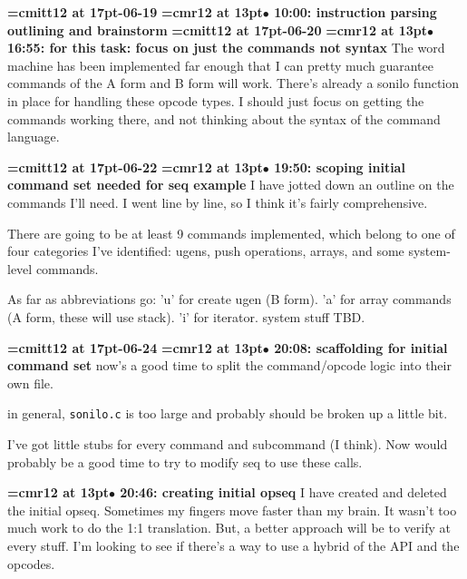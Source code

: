 {\medskip\noindent\bf\font\titlefont=cmitt12 at 17pt-06-19}\medskip
{\smallskip\noindent\bf\font\titlefont=cmr12 at 13pt\titlefont $\bullet$ 10:00: instruction parsing outlining and brainstorm}\smallskip
{\medskip\noindent\bf\font\titlefont=cmitt12 at 17pt-06-20}\medskip
{\smallskip\noindent\bf\font\titlefont=cmr12 at 13pt\titlefont $\bullet$ 16:55: for this task: focus on just the commands not syntax}\smallskip
The word machine has been implemented far enough that I can pretty much guarantee commands of the A form and B form will work. There's already a sonilo function in place for handling these opcode types. I should just focus on getting the commands working there, and not thinking about the syntax of the command language.
\par

{\medskip\noindent\bf\font\titlefont=cmitt12 at 17pt-06-22}\medskip
{\smallskip\noindent\bf\font\titlefont=cmr12 at 13pt\titlefont $\bullet$ 19:50: scoping initial command set needed for seq example}\smallskip
I have jotted down an outline on the commands I'll need. I went line by line, so I think it's fairly comprehensive.
\par

There are going to be at least 9 commands implemented, which belong to one of four categories I've identified: ugens, push operations, arrays, and some system-level commands.
\par

As far as abbreviations go: 'u' for create ugen (B form). 'a' for array commands (A form, these will use stack). 'i' for iterator. system stuff TBD.
\par

{\medskip\noindent\bf\font\titlefont=cmitt12 at 17pt-06-24}\medskip
{\smallskip\noindent\bf\font\titlefont=cmr12 at 13pt\titlefont $\bullet$ 20:08: scaffolding for initial command set}\smallskip
now's a good time to split the command/opcode logic into their own file.
\par

in general, {\tt sonilo.c} is too large and probably should be broken up a little bit.
\par

I've got little stubs for every command and subcommand (I think). Now would probably be a good time to try to modify seq to use these calls.
\par

{\smallskip\noindent\bf\font\titlefont=cmr12 at 13pt\titlefont $\bullet$ 20:46: creating initial opseq}\smallskip
I have created and deleted the initial opseq. Sometimes my fingers move faster than my brain. It wasn't too much work to do the 1:1 translation. But, a better approach will be to verify at every stuff. I'm looking to see if there's a way to use a hybrid of the API and the opcodes.
\par

